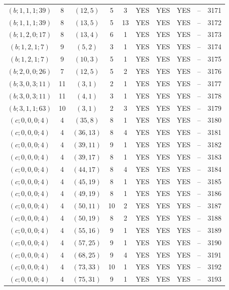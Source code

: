 \begin{longtable}{|c|c|c|c|c|c|c|c|c|c|}
$(b; 1, 1, 1; 39)$ & 8 & $(12, 5)$ & 5 & 3 & YES & YES & YES & -- & 3171\\
$(b; 1, 1, 1; 39)$ & 8 & $(13, 5)$ & 5 & 13 & YES & YES & YES & -- & 3172\\
$(b; 1, 2, 0; 17)$ & 8 & $(13, 4)$ & 6 & 1 & YES & YES & YES & -- & 3173\\
$(b; 1, 2, 1; 7)$ & 9 & $(5, 2)$ & 3 & 1 & YES & YES & YES & -- & 3174\\
$(b; 1, 2, 1; 7)$ & 9 & $(10, 3)$ & 5 & 1 & YES & YES & YES & -- & 3175\\
$(b; 2, 0, 0; 26)$ & 7 & $(12, 5)$ & 5 & 2 & YES & YES & YES & -- & 3176\\
$(b; 3, 0, 3; 11)$ & 11 & $(3, 1)$ & 2 & 1 & YES & YES & YES & -- & 3177\\
$(b; 3, 0, 3; 11)$ & 11 & $(4, 1)$ & 3 & 1 & YES & YES & YES & -- & 3178\\
$(b; 3, 1, 1; 63)$ & 10 & $(3, 1)$ & 2 & 3 & YES & YES & YES & -- & 3179\\
$(c; 0, 0, 0; 4)$ & 4 & $(35, 8)$ & 8 & 1 & YES & YES & YES & -- & 3180\\
$(c; 0, 0, 0; 4)$ & 4 & $(36, 13)$ & 8 & 4 & YES & YES & YES & -- & 3181\\
$(c; 0, 0, 0; 4)$ & 4 & $(39, 11)$ & 9 & 1 & YES & YES & YES & -- & 3182\\
$(c; 0, 0, 0; 4)$ & 4 & $(39, 17)$ & 8 & 1 & YES & YES & YES & -- & 3183\\
$(c; 0, 0, 0; 4)$ & 4 & $(44, 17)$ & 8 & 4 & YES & YES & YES & -- & 3184\\
$(c; 0, 0, 0; 4)$ & 4 & $(45, 19)$ & 8 & 1 & YES & YES & YES & -- & 3185\\
$(c; 0, 0, 0; 4)$ & 4 & $(49, 19)$ & 8 & 1 & YES & YES & YES & -- & 3186\\
$(c; 0, 0, 0; 4)$ & 4 & $(50, 11)$ & 10 & 2 & YES & YES & YES & -- & 3187\\
$(c; 0, 0, 0; 4)$ & 4 & $(50, 19)$ & 8 & 2 & YES & YES & YES & -- & 3188\\
$(c; 0, 0, 0; 4)$ & 4 & $(55, 16)$ & 9 & 1 & YES & YES & YES & -- & 3189\\
$(c; 0, 0, 0; 4)$ & 4 & $(57, 25)$ & 9 & 1 & YES & YES & YES & -- & 3190\\
$(c; 0, 0, 0; 4)$ & 4 & $(68, 25)$ & 9 & 4 & YES & YES & YES & -- & 3191\\
$(c; 0, 0, 0; 4)$ & 4 & $(73, 33)$ & 10 & 1 & YES & YES & YES & -- & 3192\\
$(c; 0, 0, 0; 4)$ & 4 & $(75, 31)$ & 9 & 1 & YES & YES & YES & -- & 3193\\

\end{longtable}

